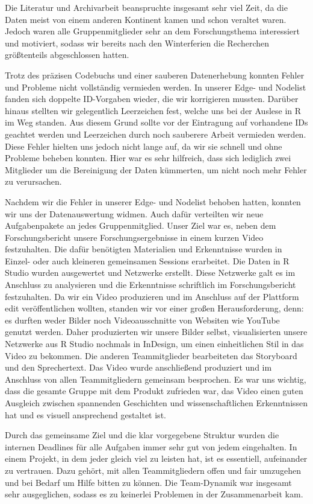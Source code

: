 \documentclass[
]{article}
\begin{document}
Die Literatur und Archivarbeit beanspruchte insgesamt sehr viel Zeit, da
die Daten meist von einem anderen Kontinent kamen und schon veraltet
waren. Jedoch waren alle Gruppenmitglieder sehr an dem Forschungsthema
interessiert und motiviert, sodass wir bereits nach den Winterferien die
Recherchen größtenteils abgeschlossen hatten.

Trotz des präzisen Codebuchs und einer sauberen Datenerhebung konnten
Fehler und Probleme nicht vollständig vermieden werden. In unserer Edge-
und Nodelist fanden sich doppelte ID-Vorgaben wieder, die wir
korrigieren mussten. Darüber hinaus stellten wir gelegentlich
Leerzeichen fest, welche uns bei der Auslese in R im Weg standen. Aus
diesem Grund sollte vor der Eintragung auf vorhandene IDs geachtet
werden und Leerzeichen durch noch sauberere Arbeit vermieden werden.
Diese Fehler hielten uns jedoch nicht lange auf, da wir sie schnell und
ohne Probleme beheben konnten. Hier war es sehr hilfreich, dass sich
lediglich zwei Mitglieder um die Bereinigung der Daten kümmerten, um
nicht noch mehr Fehler zu verursachen.

Nachdem wir die Fehler in unserer Edge- und Nodelist behoben hatten,
konnten wir uns der Datenauswertung widmen. Auch dafür verteilten wir
neue Aufgabenpakete an jedes Gruppenmitglied. Unser Ziel war es, neben
dem Forschungsbericht unsere Forschungsergebnisse in einem kurzen Video
festzuhalten. Die dafür benötigten Materialien und Erkenntnisse wurden
in Einzel- oder auch kleineren gemeinsamen Sessions erarbeitet. Die
Daten in R Studio wurden ausgewertet und Netzwerke erstellt. Diese
Netzwerke galt es im Anschluss zu analysieren und die Erkenntnisse
schriftlich im Forschungsbericht festzuhalten. Da wir ein Video
produzieren und im Anschluss auf der Plattform edit veröffentlichen
wollten, standen wir vor einer großen Herausforderung, denn: es durften
weder Bilder noch Videoausschnitte von Websiten wie YouTube genutzt
werden. Daher produzierten wir unsere Bilder selbst, visualisierten
unsere Netzwerke aus R Studio nochmals in InDesign, um einen
einheitlichen Stil in das Video zu bekommen. Die anderen Teammitglieder
bearbeiteten das Storyboard und den Sprechertext. Das Video wurde
anschließend produziert und im Anschluss von allen Teammitgliedern
gemeinsam besprochen. Es war uns wichtig, dass die gesamte Gruppe mit
dem Produkt zufrieden war, das Video einen guten Ausgleich zwischen
spannenden Geschichten und wissenschaftlichen Erkenntnissen hat und es
visuell ansprechend gestaltet ist.

Durch das gemeinsame Ziel und die klar vorgegebene Struktur wurden die
internen Deadlines für alle Aufgaben immer sehr gut von jedem
eingehalten. In einem Projekt, in dem jeder gleich viel zu leisten hat,
ist es essentiell, aufeinander zu vertrauen. Dazu gehört, mit allen
Teammitgliedern offen und fair umzugehen und bei Bedarf um Hilfe bitten
zu können. Die Team-Dynamik war insgesamt sehr ausgeglichen, sodass es
zu keinerlei Problemen in der Zusammenarbeit kam.
\end{document}
